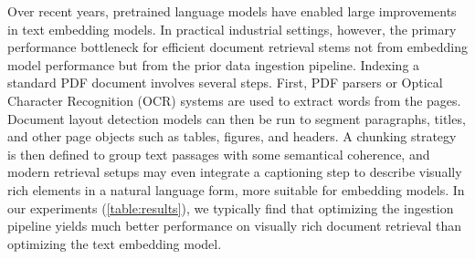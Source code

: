 \documentclass{article} %
\newcommand{\code}[1]{\texttt{#1}}
\begin{document}
\noindent Over recent years, pretrained language models have enabled large improvements in text embedding models. In practical industrial settings, however, the primary performance bottleneck for efficient document retrieval stems not from embedding model performance but from the prior data ingestion pipeline. Indexing a standard PDF document involves several steps. First, PDF parsers or Optical Character Recognition (OCR) systems are used to extract words from the pages. Document layout detection models can then be run to segment paragraphs, titles, and other page objects such as tables, figures, and headers. A chunking strategy is then defined to group text passages with some semantical coherence, and modern retrieval setups may even integrate a captioning step to describe visually rich elements in a natural language form, more suitable for embedding models. 
In our experiments (\autoref{table:results}), we typically find that optimizing the ingestion pipeline yields much better performance on visually rich document retrieval than optimizing the text embedding model.



\end{document}
